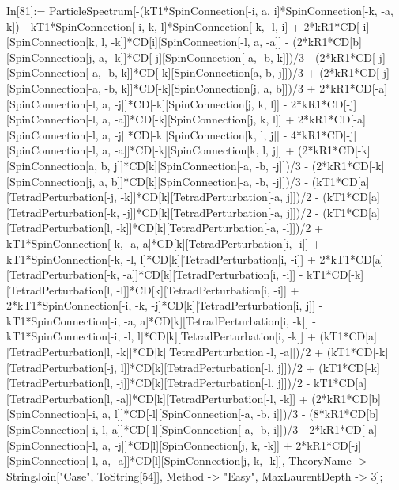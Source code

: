 In[81]:= ParticleSpectrum[-(kT1*SpinConnection[-i, a, i]*SpinConnection[-k, -a, k]) - kT1*SpinConnection[-i, k, l]*SpinConnection[-k, -l, i] + 2*kR1*CD[-i][SpinConnection[k, l, -k]]*CD[i][SpinConnection[-l, a, -a]] - (2*kR1*CD[b][SpinConnection[j, a, -k]]*CD[-j][SpinConnection[-a, -b, k]])/3 - (2*kR1*CD[-j][SpinConnection[-a, -b, k]]*CD[-k][SpinConnection[a, b, j]])/3 + (2*kR1*CD[-j][SpinConnection[-a, -b, k]]*CD[-k][SpinConnection[j, a, b]])/3 + 2*kR1*CD[-a][SpinConnection[-l, a, -j]]*CD[-k][SpinConnection[j, k, l]] - 2*kR1*CD[-j][SpinConnection[-l, a, -a]]*CD[-k][SpinConnection[j, k, l]] + 2*kR1*CD[-a][SpinConnection[-l, a, -j]]*CD[-k][SpinConnection[k, l, j]] - 4*kR1*CD[-j][SpinConnection[-l, a, -a]]*CD[-k][SpinConnection[k, l, j]] + (2*kR1*CD[-k][SpinConnection[a, b, j]]*CD[k][SpinConnection[-a, -b, -j]])/3 - (2*kR1*CD[-k][SpinConnection[j, a, b]]*CD[k][SpinConnection[-a, -b, -j]])/3 - (kT1*CD[a][TetradPerturbation[-j, -k]]*CD[k][TetradPerturbation[-a, j]])/2 - (kT1*CD[a][TetradPerturbation[-k, -j]]*CD[k][TetradPerturbation[-a, j]])/2 - (kT1*CD[a][TetradPerturbation[l, -k]]*CD[k][TetradPerturbation[-a, -l]])/2 + kT1*SpinConnection[-k, -a, a]*CD[k][TetradPerturbation[i, -i]] + kT1*SpinConnection[-k, -l, l]*CD[k][TetradPerturbation[i, -i]] + 2*kT1*CD[a][TetradPerturbation[-k, -a]]*CD[k][TetradPerturbation[i, -i]] - kT1*CD[-k][TetradPerturbation[l, -l]]*CD[k][TetradPerturbation[i, -i]] + 2*kT1*SpinConnection[-i, -k, -j]*CD[k][TetradPerturbation[i, j]] - kT1*SpinConnection[-i, -a, a]*CD[k][TetradPerturbation[i, -k]] - kT1*SpinConnection[-i, -l, l]*CD[k][TetradPerturbation[i, -k]] + (kT1*CD[a][TetradPerturbation[l, -k]]*CD[k][TetradPerturbation[-l, -a]])/2 + (kT1*CD[-k][TetradPerturbation[-j, l]]*CD[k][TetradPerturbation[-l, j]])/2 + (kT1*CD[-k][TetradPerturbation[l, -j]]*CD[k][TetradPerturbation[-l, j]])/2 - kT1*CD[a][TetradPerturbation[l, -a]]*CD[k][TetradPerturbation[-l, -k]] + (2*kR1*CD[b][SpinConnection[-i, a, l]]*CD[-l][SpinConnection[-a, -b, i]])/3 - (8*kR1*CD[b][SpinConnection[-i, l, a]]*CD[-l][SpinConnection[-a, -b, i]])/3 - 2*kR1*CD[-a][SpinConnection[-l, a, -j]]*CD[l][SpinConnection[j, k, -k]] + 2*kR1*CD[-j][SpinConnection[-l, a, -a]]*CD[l][SpinConnection[j, k, -k]], TheoryName -> StringJoin["Case", ToString[54]], Method -> "Easy", MaxLaurentDepth -> 3]; 